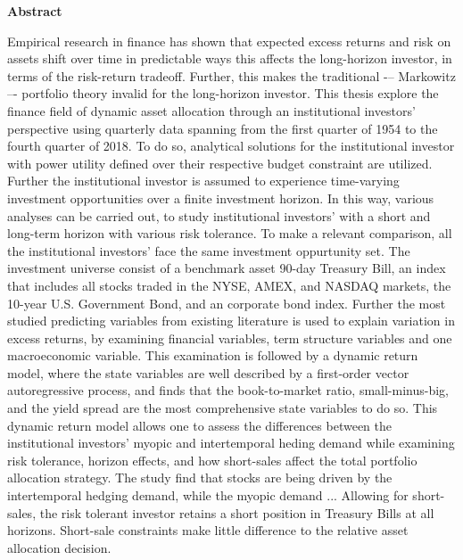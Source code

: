 \documentclass[
  a4paper,
  oneside]{memoir}
\begin{document}
\begin{titlingpage}
\begin{center}
\textbf{Abstract}
\end{center}
\begin{center}
\begin{minipage}{15cm}
Empirical research in finance has shown that expected excess returns and risk
on assets shift over time in predictable ways this affects the long-horizon investor, in terms of the risk-return tradeoff. Further, this makes the traditional -– Markowitz –- portfolio theory invalid for the long-horizon investor. This thesis explore the finance field of dynamic asset allocation through an institutional investors' perspective using quarterly data spanning from the first quarter of 1954 to the fourth quarter of 2018. To do so, analytical solutions for the institutional investor with power utility defined over their respective budget constraint are utilized. Further the institutional investor is assumed to experience time-varying investment opportunities over a finite investment horizon. In this way, various analyses can be carried out, to study institutional investors' with a short and long-term horizon with various risk tolerance. To make a relevant comparison, all the institutional investors' face the same investment oppurtunity set. The investment universe consist of a benchmark asset 90-day Treasury Bill, an index that includes all stocks traded in the NYSE, AMEX, and NASDAQ markets, the 10-year U.S. Government Bond, and an corporate bond index. Further the most studied predicting variables from existing literature is used to explain variation in excess returns, by examining financial variables, term structure variables and one macroeconomic variable. This examination is followed by a dynamic return model, where the state variables are well described by a first-order vector autoregressive process, and finds that the book-to-market ratio, small-minus-big, and the yield spread are the most comprehensive state variables to do so. This dynamic return model allows one to assess the differences between the institutional investors' myopic and intertemporal heding demand while examining risk tolerance, horizon effects, and how short-sales affect the total portfolio allocation strategy. The study find that stocks are being driven by the intertemporal hedging demand, while the myopic demand ... Allowing for short-sales, the risk tolerant investor retains a short position in Treasury Bills at all horizons. Short-sale constraints make little difference to the relative asset allocation decision.
\end{minipage}
\end{center}
\end{titlingpage}
\end{document}
